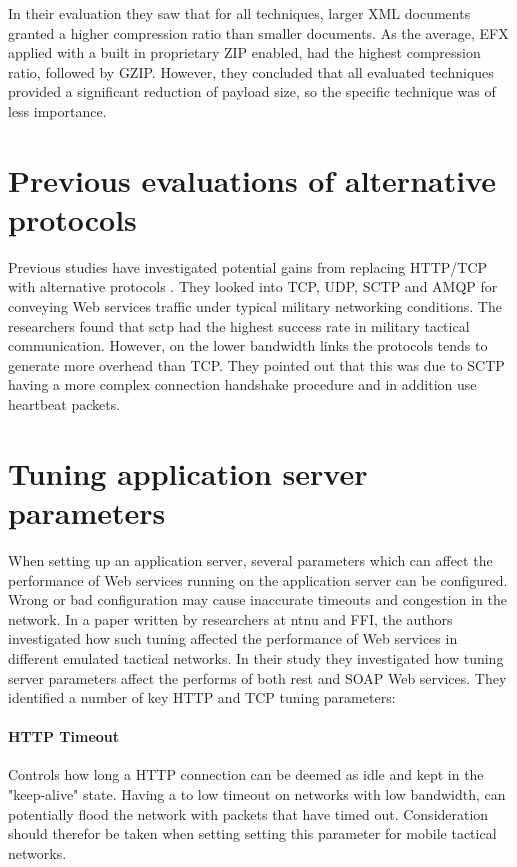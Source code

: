 In their evaluation they saw that for all techniques, larger XML documents
granted a higher compression ratio than smaller documents. As the average, EFX
applied with a built in proprietary ZIP enabled, had the highest compression
ratio, followed by GZIP. However, they concluded that all evaluated techniques
provided a significant reduction of payload size, so the specific technique was
of less importance.

\section{Previous evaluations of alternative protocols}

Previous studies have investigated potential gains from replacing HTTP/TCP with
alternative protocols \cite{evaluation-transport-protocols-web-services}. They
looked into TCP, UDP, SCTP and AMQP for conveying Web services traffic under
typical military networking conditions. The researchers found that \gls{sctp}
had the highest success rate in military tactical communication. However, on the
lower bandwidth links the protocols tends to generate more overhead than TCP.
They pointed out that this was due to SCTP having a more complex connection
handshake procedure and in addition use heartbeat packets.

\section{Tuning application server parameters}

When setting up an application server, several parameters which can affect the
performance of Web services running on the application server can be configured.
Wrong or bad configuration may cause inaccurate timeouts and congestion in the
network. In a paper written by researchers at \gls{ntnu} and FFI, the authors
investigated how such tuning affected the performance of Web services in
different emulated tactical
networks\cite{johnsen-bloebaum-recommendations-web-services-tactical-domain}. In
their study they investigated how tuning server parameters affect the performs
of both \gls{rest} and SOAP Web services. They identified a number of key HTTP
and TCP tuning parameters:

\paragraph{HTTP Timeout} Controls how long a HTTP connection can be deemed as
idle and kept in the "keep-alive" state. Having a to low timeout on networks
with low bandwidth, can potentially flood the network with packets that have
timed out. Consideration should therefor be taken when setting setting this
parameter for mobile tactical networks.

